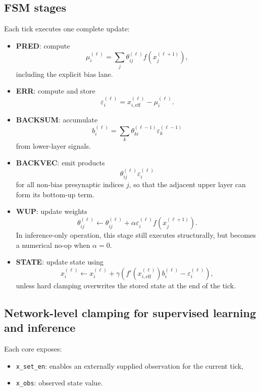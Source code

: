 \documentclass{article}
\begin{document}
\subsection{FSM stages}
\label{sec:fsm}

Each tick executes one complete update:
\begin{itemize}[leftmargin=*]
  \item \textbf{PRED}: compute
  \[
  \mu_i^{(\ell)} = \sum_j \theta^{(\ell)}_{ij} f(x_j^{(\ell+1)}),
  \]
  including the explicit bias lane.

  \item \textbf{ERR}: compute and store
  \[
  \varepsilon_i^{(\ell)} = x_{i,\mathrm{eff}}^{(\ell)} - \mu_i^{(\ell)}.
  \]

  \item \textbf{BACKSUM}: accumulate
  \[
  b_i^{(\ell)} = \sum_k \theta^{(\ell-1)}_{k i}\varepsilon_k^{(\ell-1)}
  \]
  from lower-layer signals.

  \item \textbf{BACKVEC}: emit products
  \[
  \theta^{(\ell)}_{ij}\varepsilon_i^{(\ell)}
  \]
  for all non-bias presynaptic indices \(j\), so that the adjacent upper layer can form its bottom-up term.

  \item \textbf{WUP}: update weights
  \[
  \theta^{(\ell)}_{ij} \leftarrow \theta^{(\ell)}_{ij} + \alpha \varepsilon_i^{(\ell)} f(x_j^{(\ell+1)}).
  \]
  In inference-only operation, this stage still executes structurally, but becomes a numerical no-op when \(\alpha = 0\).

  \item \textbf{STATE}: update state using
  \[
  x_i^{(\ell)} \leftarrow x_i^{(\ell)} + \gamma \left( f'\!\left(x_{i,\mathrm{eff}}^{(\ell)}\right) b_i^{(\ell)} - \varepsilon_i^{(\ell)} \right),
  \]
  unless hard clamping overwrites the stored state at the end of the tick.
\end{itemize}

\subsection{Network-level clamping for supervised learning and inference}
\label{sec:clamp}

Each core exposes:
\begin{itemize}[leftmargin=*]
  \item \texttt{x\_set\_en}: enables an externally supplied observation for the current tick,
  \item \texttt{x\_obs}: observed state value.
\end{itemize}
\end{document}
